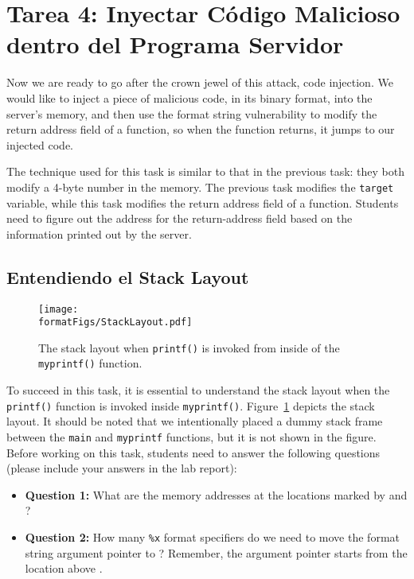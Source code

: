 \section{Tarea 4: Inyectar Código Malicioso dentro del Programa Servidor}

Now we are ready to go after the crown jewel of this attack, code injection. 
We would like to inject a piece of malicious code, in its binary format, 
into the server's memory, and then use the format string vulnerability 
to modify the return address field of a function, so when the function returns, 
it jumps to our injected code. 

The technique used for this task is similar to that in the previous task:
they both modify a 4-byte number in the memory. The previous task
modifies the \texttt{target} variable, while this task modifies the return
address field of a function. Students need to figure out the address
for the return-address field based on the information printed out 
by the server. 


\subsection{Entendiendo el Stack Layout} 

\begin{figure}[htb]
\begin{center}
\texttt{[image: \\formatFigs/StackLayout.pdf]}
\end{center}
\caption{The stack layout when \texttt{printf()} is invoked 
from inside of the \texttt{myprintf()} function.}
\label{format:fig:stacklayout}
\end{figure}

To succeed in this task, it is essential to understand the stack layout when
the \texttt{printf()} function is invoked inside \texttt{myprintf()}. 
Figure~\ref{format:fig:stacklayout} depicts the stack layout. 
It should be noted that we intentionally placed a dummy stack frame between
the \texttt{main} and \texttt{myprintf} functions, but it is not shown in the
figure. Before working on this task, students need to
answer the following questions (please include your answers
in the lab report): 


\begin{itemize}[noitemsep]
\item \textbf{Question 1:}  What are the memory addresses at the locations marked by
 and ?

\item \textbf{Question 2:} How many \texttt{\%x} format specifiers do we 
need to move the format string argument pointer to ? Remember, 
the argument pointer starts from the location above . 
\end{itemize} 



